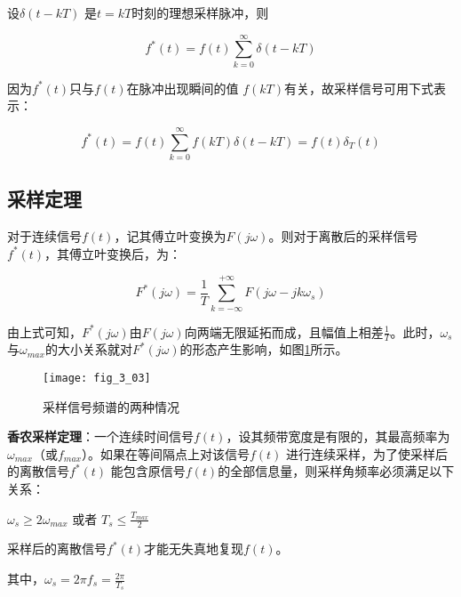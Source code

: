 设$\delta (t-kT)$ 是$t=kT$时刻的理想采样脉冲，则

\begin{equation}
  f^*(t)=f(t)\sum_{k=0}^\infty\delta(t-kT)
\end{equation}


因为$f^*(t)$只与$f(t)$在脉冲出现瞬间的值 $f(kT)$有关，故采样信号可用下式表示：

\begin{equation}
  f^*(t)=f(t)\sum_{k=0}^\infty f(kT)\delta(t-kT) = f(t)\delta_T(t)
\end{equation}



\subsection{采样定理}


对于连续信号$f(t)$，记其傅立叶变换为$F(j\omega)$。则对于离散后的采样信号$f^*(t)$，其傅立叶变换后，为：

\begin{equation}
  F^*(j\omega)=\frac{1}{T}\sum_{k=-\infty}^{+\infty}F(j\omega-jk\omega_s)
\end{equation}

由上式可知，$F^*(j\omega)$由$F(j\omega)$向两端无限延拓而成，且幅值上相差$\frac{1}{T}$。此时，$\omega_s$与$\omega_{max}$的大小关系就对$F^*(j\omega)$的形态产生影响，如图\ref{fig_3_03}所示。


\begin{figure}[h]
  \centering
  \texttt{[image: fig\_3\_03]}\\
  \caption{采样信号频谱的两种情况}\label{fig_3_03}
\end{figure}






\begin{remark}

 \textbf{香农采样定理}：一个连续时间信号$f(t)$，设其频带宽度是有限的，其最高频率为$\omega_{max}$（或$f_{max}$）。如果在等间隔点上对该信号$f(t)$ 进行连续采样，为了使采样后的离散信号$f^*(t)$ 能包含原信号$f(t)$的全部信息量，则采样角频率必须满足以下关系：

$\omega_{s}\ge2\omega_{max}$ 或者 $T_s\le \frac{T_{max}}{2}$

采样后的离散信号$f^*(t)$才能无失真地复现$f(t)$。

其中，$\omega_s=2\pi f_s=\frac{2\pi}{T_s}$

\end{remark}





